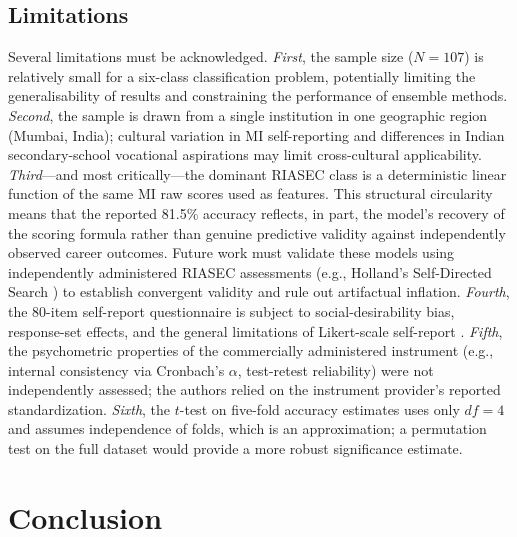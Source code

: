 \documentclass[12pt, a4paper]{article}
\begin{document}
\subsection{Limitations}

Several limitations must be acknowledged. \textit{First}, the sample size ($N = 107$) is relatively small for a six-class classification problem, potentially limiting the generalisability of results and constraining the performance of ensemble methods. \textit{Second}, the sample is drawn from a single institution in one geographic region (Mumbai, India); cultural variation in MI self-reporting \cite{shearer2018multiple} and differences in Indian secondary-school vocational aspirations may limit cross-cultural applicability. \textit{Third}---and most critically---the dominant RIASEC class is a deterministic linear function of the same MI raw scores used as features. This structural circularity means that the reported 81.5\% accuracy reflects, in part, the model's recovery of the scoring formula rather than genuine predictive validity against independently observed career outcomes. Future work must validate these models using independently administered RIASEC assessments (e.g., Holland's Self-Directed Search \citeyear{holland1997making}) to establish convergent validity and rule out artifactual inflation. \textit{Fourth}, the 80-item self-report questionnaire is subject to social-desirability bias, response-set effects, and the general limitations of Likert-scale self-report \cite{sackett2017individualized}. \textit{Fifth}, the psychometric properties of the commercially administered instrument (e.g., internal consistency via Cronbach's $\alpha$, test-retest reliability) were not independently assessed; the authors relied on the instrument provider's reported standardization. \textit{Sixth}, the $t$-test on five-fold accuracy estimates uses only $df = 4$ and assumes independence of folds, which is an approximation; a permutation test on the full dataset would provide a more robust significance estimate.

\section{Conclusion}
\end{document}
